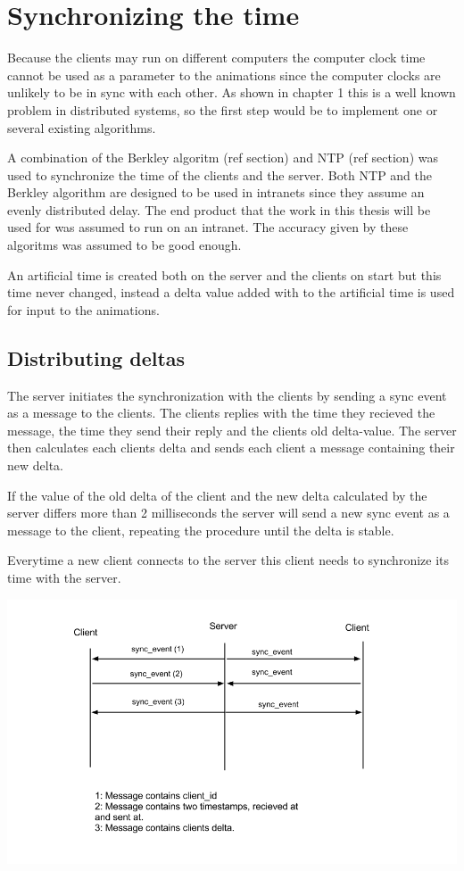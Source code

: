 \section{Synchronizing the time}

Because the clients may run on different computers the computer clock time cannot be used as a parameter to the animations since the computer clocks are unlikely to be in sync with each other. As shown in chapter 1 this is a well known problem in distributed systems, so the first step would be to implement one or several existing algorithms. 

A combination of the Berkley algoritm (ref section) and NTP (ref section) was used to synchronize the time of the clients and the server. Both NTP and the Berkley algorithm are designed to be used in intranets since they assume an evenly distributed delay. The end product that the work in this thesis will be used for was assumed to run on an intranet. The accuracy given by these algoritms was assumed to be good enough. 

An artificial time is created both on the server and the clients on start but this time never changed, instead a delta value added with to the artificial time is used for input to the animations.  

\subsection {Distributing deltas}

The server initiates the synchronization with the clients by sending a sync event as a message to the clients. The clients replies with the time they recieved the message, the time they send their reply and the clients old delta-value. The server then calculates each clients delta and sends each client a message containing their new delta. 

If the value of the old delta of the client and the new delta calculated by the server differs more than 2 milliseconds the server will send a new sync event as a message to the client, repeating the procedure until the delta is stable. 

Everytime a new client connects to the server this client needs to synchronize its time with the server. 

\includegraphics[width=1.0\textwidth]{figures/comm.png}

